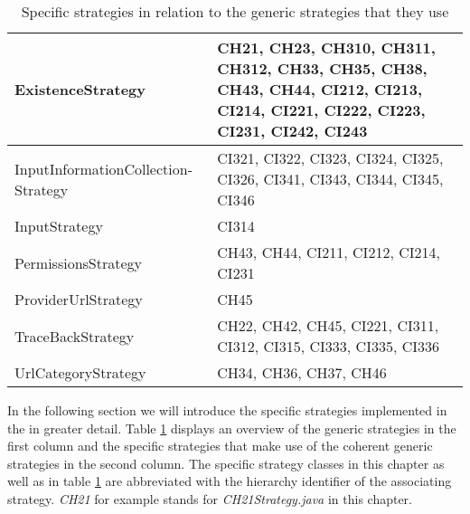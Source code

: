 \begin{table}
	\begin{center}

	\begin{tabular}{ | p{4.8cm} | p{9cm} | }
	\hline
		ExistenceStrategy & CH21, CH23, CH310, CH311, CH312, CH33, CH35, CH38, CH43, CH44, CI212, CI213, CI214, CI221, CI222, CI223, CI231, CI242, CI243 \\ \hline
		InputInformationCollection-Strategy & CI321, CI322, CI323, CI324, CI325, CI326, CI341, CI343, CI344, CI345, CI346 \\ \hline
		InputStrategy & CI314 \\ \hline
		PermissionsStrategy & CH43, CH44, CI211, CI212, CI214, CI231 \\ \hline
		ProviderUrlStrategy & CH45 \\ \hline
		TraceBackStrategy & CH22, CH42, CH45, CI221, CI311, CI312, CI315, CI333, CI335, CI336 \\ \hline
		UrlCategoryStrategy & CH34, CH36, CH37, CH46 \\ \hline
	\end{tabular}
	\end{center}
	
	\caption{Specific strategies in relation to the generic strategies that they use} 
	\label{table:specStrategies}
\end{table}

In the following section we will introduce the specific strategies implemented in the \aiprat in greater detail.
Table \ref{table:specStrategies} displays an overview of the generic strategies in the first column and the specific strategies that make use of the coherent generic strategies in the second column.
The specific strategy classes in this chapter as well as in table \ref{table:specStrategies} are abbreviated with the \ipp hierarchy identifier of the associating strategy. 
\textit{CH21} for example stands for \textit{CH21\textunderscore Strategy.java} in this chapter.

